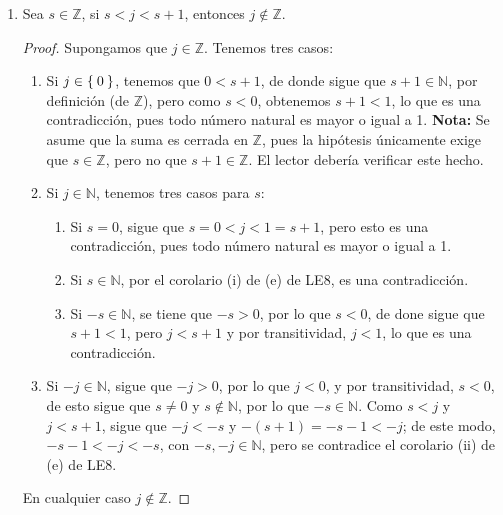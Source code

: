 \documentclass[11pt]{article}
\newcommand{\N}{\mathbb{N}}
\newcommand{\Z}{\mathbb{Z}}
\let\set\Set
\begin{document}
\begin{enumerate}[label=\alph*)]
  \item Sea $s\in \Z$, si $s<j<s+1$, entonces $j\notin \Z$.
  \begin{proof} Supongamos que $j\in \Z$. Tenemos tres casos:
    \begin{enumerate}[label=\Roman*)]
      \item Si $j\in \set{0}$, tenemos que $0<s+1$, de donde sigue que $s+1\in \N$, por definición (de $\Z$), pero como $s<0$, obtenemos $s+1<1$, lo que es una contradicción, pues todo número natural es mayor o igual a 1.
      \textbf{Nota:} Se asume que la suma es cerrada en $\Z$, pues la hipótesis únicamente exige que $s\in \Z$, pero no que $s+1\in \Z$. El lector debería verificar este hecho.
      \item Si $j\in\N$, tenemos tres casos para $s$:
      \begin{enumerate}[label=\roman*)]
        \item Si $s=0$, sigue que $s=0<j<1=s+1$, pero esto es una contradicción, pues todo número natural es mayor o igual a 1.
        \item Si $s\in \N$, por el corolario (i) de (e) de LE8, es una contradicción.
        \item Si $-s\in \N$, se tiene que $-s>0$, por lo que $s<0$, de done sigue que $s+1<1$, pero $j<s+1$ y por transitividad, $j<1$, lo que es una contradicción.
      \end{enumerate}
      \item Si $-j\in \N$, sigue que $-j>0$, por lo que $j<0$, y por transitividad, $s<0$, de esto sigue que $s\neq 0$ y $s\notin \N$, por lo que $-s\in \N$. Como $s<j$ y $j<s+1$, sigue que $-j<-s$ y $-(s+1)=-s-1<-j$; de este modo, $-s-1<-j<-s$, con $-s, -j\in \N$, pero se contradice el corolario (ii) de (e) de LE8.
    \end{enumerate}
    En cualquier caso $j\notin \Z$.
  \end{proof}


\end{enumerate}
\end{document}
